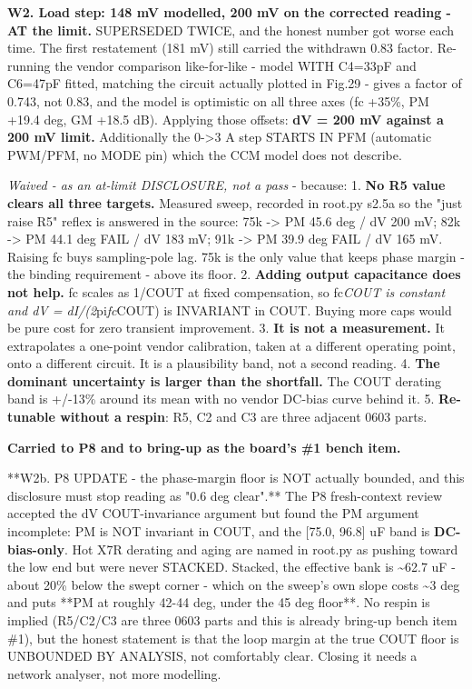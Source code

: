\documentclass[11pt,a4paper]{article}
\begin{document}
\textbf{W2. Load step: 148 mV modelled, 200 mV on the corrected reading - AT the limit.} SUPERSEDED TWICE, and the honest number got worse each time. The first restatement (181 mV) still carried the withdrawn 0.83 factor. Re-running the vendor comparison like-for-like - model WITH C4=33pF and C6=47pF fitted, matching the circuit actually plotted in Fig.29 - gives a factor of 0.743, not 0.83, and the model is optimistic on all three axes (fc +35\%, PM +19.4 deg, GM +18.5 dB). Applying those offsets: \textbf{dV = 200 mV against a 200 mV limit.} Additionally the 0-\textgreater{}3 A step STARTS IN PFM (automatic PWM/PFM, no MODE pin) which the CCM model does not describe.

\emph{Waived - as an at-limit DISCLOSURE, not a pass} - because: 1. \textbf{No R5 value clears all three targets.} Measured sweep, recorded in root.py s2.5a so the "just raise R5" reflex is answered in the source: 75k -\textgreater{} PM 45.6 deg / dV 200 mV; 82k -\textgreater{} PM 44.1 deg FAIL / dV 183 mV; 91k -\textgreater{} PM 39.9 deg FAIL / dV 165 mV. Raising fc buys sampling-pole lag. 75k is the only value that keeps phase margin - the binding requirement - above its floor. 2. \textbf{Adding output capacitance does not help.} fc scales as 1/COUT at fixed compensation, so fc\emph{COUT is constant and dV = dI/(2}pi\emph{fc}COUT) is INVARIANT in COUT. Buying more caps would be pure cost for zero transient improvement. 3. \textbf{It is not a measurement.} It extrapolates a one-point vendor calibration, taken at a different operating point, onto a different circuit. It is a plausibility band, not a second reading. 4. \textbf{The dominant uncertainty is larger than the shortfall.} The COUT derating band is +/-13\% around its mean with no vendor DC-bias curve behind it. 5. \textbf{Re-tunable without a respin}: R5, C2 and C3 are three adjacent 0603 parts.

\textbf{Carried to P8 and to bring-up as the board's \#1 bench item.}

{*}{*}W2b. P8 UPDATE - the phase-margin floor is NOT actually bounded, and this disclosure must stop reading as "0.6 deg clear".{*}{*} The P8 fresh-context review accepted the dV COUT-invariance argument but found the PM argument incomplete: PM is NOT invariant in COUT, and the {[}75.0, 96.8{]} uF band is \textbf{DC-bias-only}. Hot X7R derating and aging are named in root.py as pushing toward the low end but were never STACKED. Stacked, the effective bank is \textasciitilde{}62.7 uF - about 20\% below the swept corner - which on the sweep's own slope costs \textasciitilde{}3 deg and puts {*}{*}PM at roughly 42-44 deg, under the 45 deg floor{*}{*}. No respin is implied (R5/C2/C3 are three 0603 parts and this is already bring-up bench item \#1), but the honest statement is that the loop margin at the true COUT floor is UNBOUNDED BY ANALYSIS, not comfortably clear. Closing it needs a network analyser, not more modelling.
\end{document}
